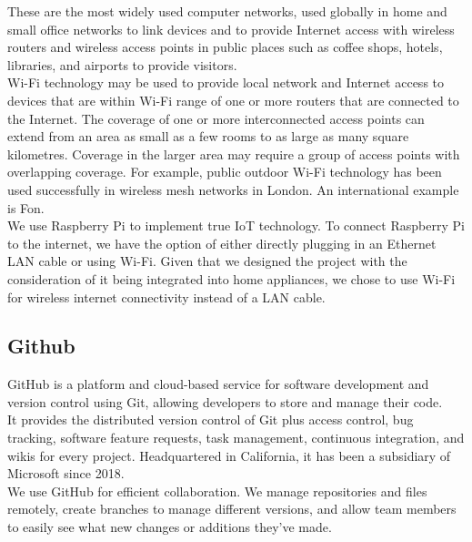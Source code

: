 These are the most widely used computer networks, used globally in home and small office networks to link devices and to provide Internet access with wireless routers and wireless access points in public places such as coffee shops, hotels, libraries, and airports to provide visitors.
\\

Wi-Fi technology may be used to provide local network and Internet access to devices that are within Wi-Fi range of one or more routers that are connected to the Internet. The coverage of one or more interconnected access points can extend from an area as small as a few rooms to as large as many square kilometres. Coverage in the larger area may require a group of access points with overlapping coverage. For example, public outdoor Wi-Fi technology has been used successfully in wireless mesh networks in London. An international example is Fon.
\\

We use Raspberry Pi to implement true IoT technology. To connect Raspberry Pi to the internet, we have the option of either directly plugging in an Ethernet LAN cable or using Wi-Fi. Given that we designed the project with the consideration of it being integrated into home appliances, we chose to use Wi-Fi for wireless internet connectivity instead of a LAN cable.\\

\subsection{\textbf{Github}}
\cite{github} GitHub is a platform and cloud-based service for software development and version control using Git, allowing developers to store and manage their code. 
\\

It provides the distributed version control of Git plus access control, bug tracking, software feature requests, task management, continuous integration, and wikis for every project. Headquartered in California, it has been a subsidiary of Microsoft since 2018.
\\

We use GitHub for efficient collaboration. We manage repositories and files remotely, create branches to manage different versions, and allow team members to easily see what new changes or additions they've made.\\

